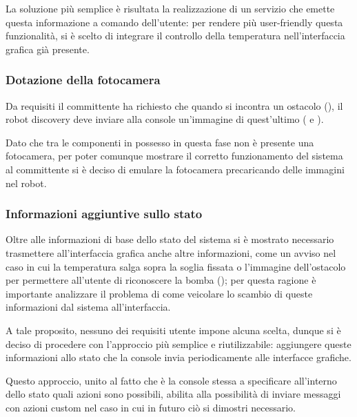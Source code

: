 La soluzione più semplice è risultata la realizzazione di un servizio che emette questa informazione a comando dell'utente:
per rendere più user-friendly questa funzionalità, si è scelto di integrare il controllo della temperatura nell'interfaccia grafica già presente.

\subsubsection{Dotazione della fotocamera}

Da requisiti il committente ha richiesto che quando si incontra un ostacolo (), il robot discovery deve inviare alla console un'immagine di quest'ultimo ( e ).

Dato che tra le componenti in possesso in questa fase non è presente una fotocamera, per poter comunque mostrare il corretto funzionamento del sistema al committente si è deciso di emulare la fotocamera precaricando delle immagini nel robot.

\subsubsection{Informazioni aggiuntive sullo stato}

Oltre alle informazioni di base dello stato del sistema si è mostrato necessario trasmettere all'interfaccia grafica anche altre informazioni, come un avviso nel caso in cui la temperatura salga sopra la soglia fissata o l'immagine dell'ostacolo per permettere all'utente di riconoscere la bomba ();
per questa ragione è importante analizzare il problema di come veicolare lo scambio di queste informazioni dal sistema all'interfaccia.

A tale proposito, nessuno dei requisiti utente impone alcuna scelta, dunque si è deciso di procedere con l'approccio più semplice e riutilizzabile:
aggiungere queste informazioni allo stato che la console invia periodicamente alle interfacce grafiche.

Questo approccio, unito al fatto che è la console stessa a specificare all'interno dello stato quali azioni sono possibili, abilita alla possibilità di inviare messaggi con azioni custom nel caso in cui in futuro ciò si dimostri necessario.

